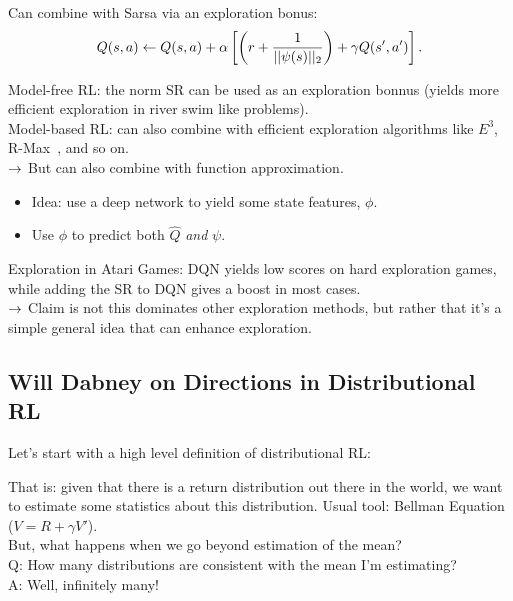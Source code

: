 Can combine with Sarsa via an exploration bonus:
\[
Q(s,a) \leftarrow Q(s,a) + \alpha \left[\left(r + \frac{1}{||\psi(s)||_2}\right) + \gamma Q(s',a')\right].
\]

Model-free RL: the norm SR can be used as an exploration bonnus (yields more efficient exploration in river swim like problems). \\

Model-based RL: can also combine with efficient exploration algorithms like $E^3$, R-Max~\cite{brafman2002r}, and so on.\\

$\rightarrow$ But can also combine with function approximation. 
\begin{itemize}
    \item Idea: use a deep network to yield some state features, $\phi$.
    \item Use $\phi$ to predict both $\hat{Q}$ {\it and} $\psi$.
\end{itemize}

Exploration in Atari Games:  DQN yields low scores on hard exploration games, while adding the SR to DQN gives a boost in most cases. \\

$\rightarrow$ Claim is not this dominates other exploration methods, but rather that it's a simple general idea that can enhance exploration.

\spacerule


\subsection{Will Dabney on Directions in Distributional RL}
\label{sec:will-a}

Let's start with a high level definition of distributional RL:

That is: given that there is a return distribution out there in the world, we want to estimate some statistics about this distribution. Usual tool: Bellman Equation ($V = R + \gamma V'$). \\

But, what happens when we go beyond estimation of the mean? \\

Q: How many distributions are consistent with the mean I'm estimating? \\

A: Well, infinitely many! \\

